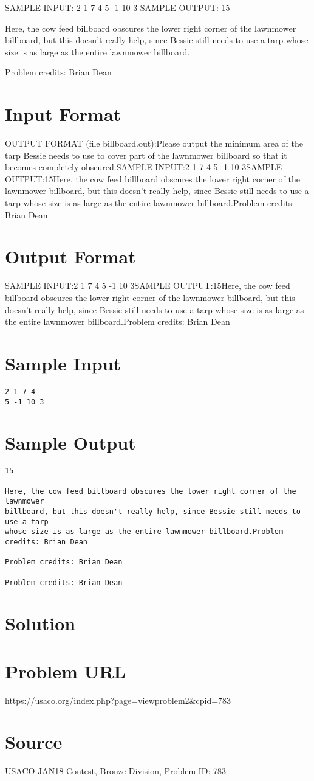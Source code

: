 \documentclass[12pt]{article}
\begin{document}
SAMPLE INPUT:
2 1 7 4
5 -1 10 3
SAMPLE OUTPUT: 
15

Here, the cow feed billboard obscures the lower right corner of the lawnmower
billboard, but this doesn't really help, since Bessie still needs to use a tarp
whose size is as large as the entire lawnmower billboard.


Problem credits: Brian Dean



\section*{Input Format}
OUTPUT FORMAT (file billboard.out):Please output the minimum area of the tarp Bessie needs to use to cover part of
the lawnmower billboard so that it becomes completely obscured.SAMPLE INPUT:2 1 7 4
5 -1 10 3SAMPLE OUTPUT:15Here, the cow feed billboard obscures the lower right corner of the lawnmower
billboard, but this doesn't really help, since Bessie still needs to use a tarp
whose size is as large as the entire lawnmower billboard.Problem credits: Brian Dean

\section*{Output Format}
SAMPLE INPUT:2 1 7 4
5 -1 10 3SAMPLE OUTPUT:15Here, the cow feed billboard obscures the lower right corner of the lawnmower
billboard, but this doesn't really help, since Bessie still needs to use a tarp
whose size is as large as the entire lawnmower billboard.Problem credits: Brian Dean

\section*{Sample Input}
\begin{verbatim}
2 1 7 4
5 -1 10 3
\end{verbatim}

\section*{Sample Output}
\begin{verbatim}
15

Here, the cow feed billboard obscures the lower right corner of the lawnmower
billboard, but this doesn't really help, since Bessie still needs to use a tarp
whose size is as large as the entire lawnmower billboard.Problem credits: Brian Dean

Problem credits: Brian Dean

Problem credits: Brian Dean
\end{verbatim}

\section*{Solution}


\section*{Problem URL}
https://usaco.org/index.php?page=viewproblem2&cpid=783

\section*{Source}
USACO JAN18 Contest, Bronze Division, Problem ID: 783
\end{document}
